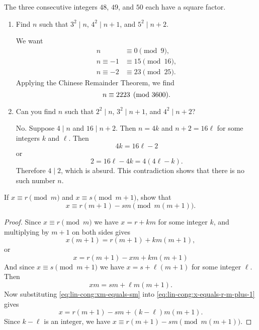  The three consecutive integers $48$, $49$, and $50$ each
have a square factor.
\begin{enumerate}
\item Find $n$ such that $3^2\mid n$, $4^2\mid n+1$, and
  $5^2\mid n+2$.
  \begin{solution}
    We want
    \begin{align*}
      n&\equiv0\pmod9, \\
      n\equiv-1&\equiv15\pmod{16}, \\
      n\equiv-2&\equiv23\pmod{25}.
    \end{align*}
    Applying the Chinese Remainder Theorem, we find
    \begin{equation*}
      n\equiv2223\pmod{3600}. \qedhere
    \end{equation*}
  \end{solution}
\item Can you find $n$ such that $2^2\mid n$, $3^2\mid n+1$, and
  $4^2\mid n+2$?
  \begin{solution}
    No. Suppose $4\mid n$ and $16\mid n+2$. Then $n = 4k$ and
    $n+2 = 16\ell$ for some integers $k$ and $\ell$. Then
    \begin{equation*}
      4k = 16\ell - 2
    \end{equation*}
    or
    \begin{equation*}
      2 = 16\ell - 4k = 4(4\ell - k).
    \end{equation*}
    Therefore $4\mid 2$, which is absurd. This contradiction shows
    that there is no such number $n$.
  \end{solution}
\end{enumerate}

 If $x\equiv r\pmod{m}$ and $x\equiv s\pmod{m+1}$, show
that
\begin{equation*}
  x\equiv r(m + 1) - sm \pmod{m(m+1)}.
\end{equation*}
\begin{proof}
  Since $x\equiv r\pmod{m}$ we have $x = r + km$ for some integer $k$,
  and multiplying by $m + 1$ on both sides gives
  \begin{equation*}
    x(m + 1) = r(m + 1) + km(m + 1),
  \end{equation*}
  or
  \begin{equation}
    \label{eq:lin-cong:x-equals-r-m-plus-1}
    x = r(m + 1) - xm + km(m + 1)
  \end{equation}
  And since $x\equiv s\pmod{m+1}$ we have $x = s + \ell(m + 1)$ for
  some integer $\ell$. Then
  \begin{equation}
    \label{eq:lin-cong:xm-equals-sm}
    xm = sm + \ell m(m + 1).
  \end{equation}
  Now substituting \eqref{eq:lin-cong:xm-equals-sm} into
  \eqref{eq:lin-cong:x-equals-r-m-plus-1} gives
  \begin{equation*}
    x = r(m + 1) - sm + (k - \ell)m(m + 1).
  \end{equation*}
  Since $k - \ell$ is an integer, we have
  $x\equiv r(m + 1) - sm \pmod{m(m+1)}$.
\end{proof}
